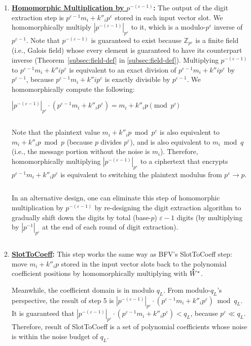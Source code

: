 \begin{enumerate}
\item \textbf{\underline{Homomorphic Multiplication by \boldmath$p^{-(\varepsilon-1)}$}:} 
The output of the digit extraction step is $p^{\varepsilon-1}m_i + k''_ip^\varepsilon$ stored in each input vector slot. We homomorphically multiply $|p^{-(\varepsilon-1)}|_{p^\varepsilon}$ to it, which is a modulo-$p^\varepsilon$ inverse of $p^{\varepsilon-1}$. 
Note that $p^{-(\varepsilon-1)}$ is guaranteed to exist because $\mathbb{Z}_{p^\varepsilon}$ is a finite field (i.e., Galois field) whose every element is guaranteed to have its counterpart inverse (Theorem~\ref*{subsec:field-def} in \autoref{subsec:field-def}). Multiplying $p^{-(\varepsilon-1)}$ to $p^{\varepsilon-1}m_i + k''ip^\varepsilon$ is equivalent to an exact division of $p^{\varepsilon-1}m_i + k''ip^\varepsilon$ by $p^{\varepsilon-1}$, because $p^{\varepsilon-1}m_i + k''ip^\varepsilon$ is exactly divisible by $p^{\varepsilon-1}$. We homomorphically compute the following:

$|p^{-(\varepsilon-1)}|_{p^\varepsilon} \cdot (p^{\varepsilon-1}m_i + k''_ip^\varepsilon) = m_i + k''_ip \pmod{p^\varepsilon}$ 

$ $

Note that the plaintext value $m_i + k''_ip \bmod p^\varepsilon$ is also equivalent to $m_i + k''_ip \bmod p$ (because $p$ divides $p^\varepsilon$), and is also equivalent to $m_i \bmod q$ (i.e., the message portion without the noise is $m_i$). Therefore, homomorphically multiplying $|p^{-(\varepsilon-1)}|_{p^\varepsilon}$ to a ciphertext that encrypts $p^{\varepsilon-1}m_i + k''_ip^\varepsilon$ is equivalent to switching the plaintext modulus from $p^\varepsilon \rightarrow p$. 

$ $

In an alternative design, one can eliminate this step of homomorphic multiplication by $p^{-(\varepsilon-1)}$ by re-designing the digit extraction algorithm to gradually shift down the digits by total (base-$p$) $\varepsilon-1$ digits (by multiplying by $|p^{-1}|_{p^{\varepsilon}}$ at the end of each round of digit extraction). 


$ $


\item \textbf{\textsf{\underline{SlotToCoeff}}:} This step works the same way as BFV's \textsf{SlotToCoeff} step: move $m_i + k''_ip$ stored in the input vector slots back to the polynomial coefficient positions by homomorphically multiplying with $\hathat W^*$. 

Meanwhile, the coefficient domain is in modulo $q_L$. From modulo-$q_L$'s perspective, the result of step 5 is $|p^{-(\varepsilon-1)}|_{p^\varepsilon} \cdot (p^{\varepsilon-1}m_i + k''_ip^\varepsilon) \bmod q_L$. It is guaranteed that $|p^{-(\varepsilon-1)}|_{p^\varepsilon} \cdot (p^{\varepsilon-1}m_i + k''_ip^\varepsilon) < q_L$, because $p^\varepsilon \ll q_L$. Therefore, result of \textsf{SlotToCoeff} is a set of polynomial coefficients whose noise is within the noise budget of $q_L$. 


\end{enumerate}
